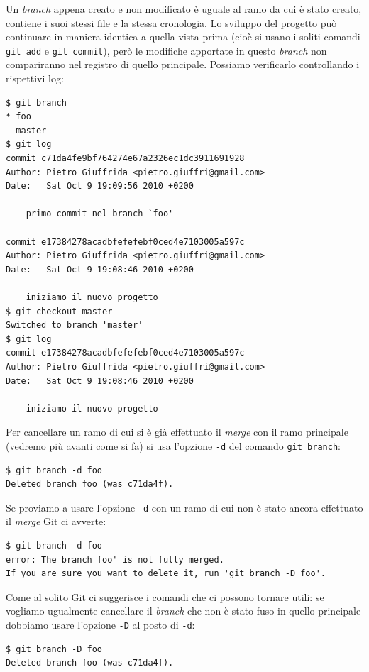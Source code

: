 \documentclass[a4paper,12pt,oneside]{article}
\begin{document}
Un \emph{branch} appena creato e non modificato è uguale al ramo da cui è stato
creato, contiene i suoi stessi file e la stessa cronologia. Lo sviluppo del progetto
può continuare in maniera identica a quella vista prima (cioè si usano i soliti
comandi \lstinline|git add| e \lstinline|git commit|), però le modifiche apportate
in questo \emph{branch} non compariranno nel registro di quello principale. Possiamo
verificarlo controllando i rispettivi log:
\begin{lstlisting}
$ git branch
* foo
  master
$ git log
commit c71da4fe9bf764274e67a2326ec1dc3911691928
Author: Pietro Giuffrida <pietro.giuffri@gmail.com>
Date:   Sat Oct 9 19:09:56 2010 +0200

    primo commit nel branch `foo'

commit e17384278acadbfefefebf0ced4e7103005a597c
Author: Pietro Giuffrida <pietro.giuffri@gmail.com>
Date:   Sat Oct 9 19:08:46 2010 +0200

    iniziamo il nuovo progetto
$ git checkout master
Switched to branch 'master'
$ git log
commit e17384278acadbfefefebf0ced4e7103005a597c
Author: Pietro Giuffrida <pietro.giuffri@gmail.com>
Date:   Sat Oct 9 19:08:46 2010 +0200

    iniziamo il nuovo progetto
\end{lstlisting}

Per cancellare un ramo di cui si è già effettuato il \emph{merge} con il ramo
principale (vedremo più avanti come si fa) si usa l'opzione \lstinline|-d| del
comando \lstinline|git branch|:
\begin{lstlisting}
$ git branch -d foo
Deleted branch foo (was c71da4f).
\end{lstlisting}
Se proviamo a usare l'opzione \lstinline|-d| con un ramo di cui non è stato
ancora effettuato il \emph{merge} Git ci avverte:
\begin{lstlisting}
$ git branch -d foo
error: The branch foo' is not fully merged.
If you are sure you want to delete it, run 'git branch -D foo'.
\end{lstlisting}
Come al solito Git ci suggerisce i comandi che ci possono tornare utili: se
vogliamo ugualmente cancellare il \emph{branch} che non è stato fuso in quello
principale dobbiamo usare l'opzione \lstinline|-D| al posto di \lstinline|-d|:
\begin{lstlisting}
$ git branch -D foo
Deleted branch foo (was c71da4f).
\end{lstlisting}
\end{document}
